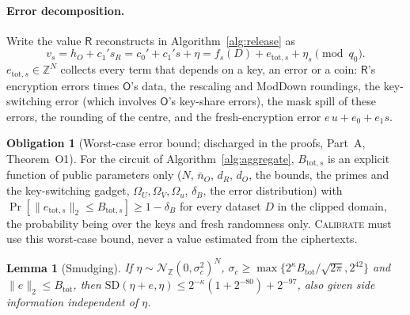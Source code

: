 \documentclass[11pt]{article}
\theoremstyle{definition}
\newtheorem{obligation}{Obligation}
\theoremstyle{plain}
\newtheorem{lemma}{Lemma}
\newcommand{\Rp}{\mathsf{R}}
\newcommand{\Op}{\mathsf{O}}
\newcommand{\Z}{\mathbb{Z}}
\newcommand{\DG}{\mathcal{N}_{\Z}}
\begin{document}
\paragraph{Error decomposition.} Write the value $\Rp$ reconstructs in Algorithm~\ref{alg:release} as
\[
  v_s=h_O+c_1's_R=c_0'+c_1's+\eta=f_s(D)+e_{\mathrm{tot},s}+\eta_s\pmod{q_0}.
\]
$e_{\mathrm{tot},s}\in\Z^N$ collects every term that depends on a key, an error or a coin: $\Rp$'s encryption errors times $\Op$'s data, the rescaling and ModDown roundings, the key-switching error (which involves $\Op$'s key-share errors), the mask spill of these errors, the rounding of the centre, and the fresh-encryption error $e\,u+e_0+e_1s$.

\begin{obligation}[Worst-case error bound; discharged in the proofs, Part~A, Theorem~O1]\label{obl:err}
For the circuit of Algorithm~\ref{alg:aggregate}, $B_{\mathrm{tot},s}$ is an explicit function of public parameters only ($N$, $\bar n_O$, $d_R$, $d_O$, the bounds, the primes and the key-switching gadget, $\Omega_U,\Omega_V,\Omega_u$, $\delta_B$, the error distribution) with $\Pr[\|e_{\mathrm{tot},s}\|_2\le B_{\mathrm{tot},s}]\ge1-\delta_B$ for every dataset $D$ in the clipped domain, the probability being over the keys and fresh randomness only. \textsc{Calibrate} must use this worst-case bound, never a value estimated from the ciphertexts.
\end{obligation}

\begin{lemma}[Smudging]\label{lem:smudge}
If $\eta\sim\DG(0,\sigma_c^2)^N$, $\sigma_c\ge\max\{2^{\kappa}B_{\mathrm{tot}}/\sqrt{2\pi},2^{42}\}$ and $\|e\|_2\le B_{\mathrm{tot}}$, then $\mathrm{SD}(\eta+e,\eta)\le2^{-\kappa}(1+2^{-80})+2^{-97}$, also given side information independent of $\eta$.
\end{lemma}
\end{document}

